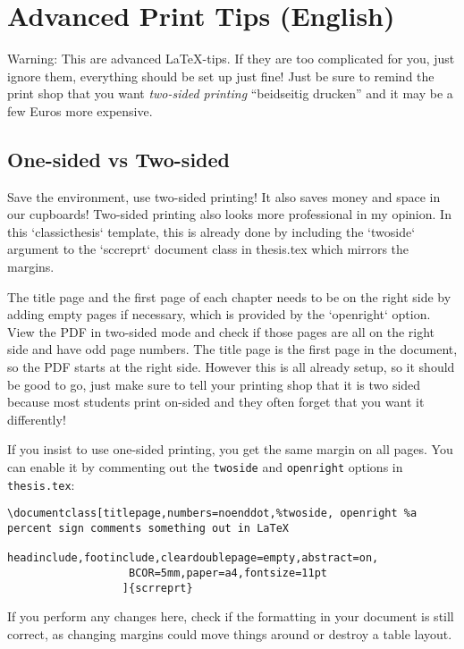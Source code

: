 \chapter{Advanced Print Tips (English)}
Warning: This are advanced \LaTeX{}-tips. If they are too complicated for you, just ignore them, everything should be set up just fine! Just be sure to remind the print shop that you want \emph{two-sided printing} \enquote{beidseitig drucken} and it may be a few Euros more expensive.

\section{One-sided vs Two-sided}
Save the environment, use two-sided printing!
It also saves money and space in our cupboards!
Two-sided printing also looks more professional in my opinion.
In this `classicthesis` template, this is already done by including the `twoside` argument to the `sccreprt` document class in thesis.tex which mirrors the margins.

The title page and the first page of each chapter needs to be on the right side by adding empty pages if necessary, which is provided by the `openright` option.
View the PDF in two-sided mode and check if those pages are all on the right side and have odd page numbers.
The title page is the first page in the document, so the PDF starts at the right side.
However this is all already setup, so it should be good to go, just make sure to tell your printing shop that it is two sided because most students print on-sided and they often forget that you want it differently!

If you insist to use one-sided printing, you get the same margin on all pages.
You can enable it by commenting out the \texttt{twoside} and \texttt{openright} options in \texttt{thesis.tex}:

\begin{lstlisting}
\documentclass[titlepage,numbers=noenddot,%twoside, openright %a percent sign comments something out in LaTeX
                   headinclude,footinclude,cleardoublepage=empty,abstract=on,
                   BCOR=5mm,paper=a4,fontsize=11pt
                  ]{scrreprt}
\end{lstlisting}

If you perform any changes here, check if the formatting in your document is still correct, as changing margins could move things around or destroy a table layout.

